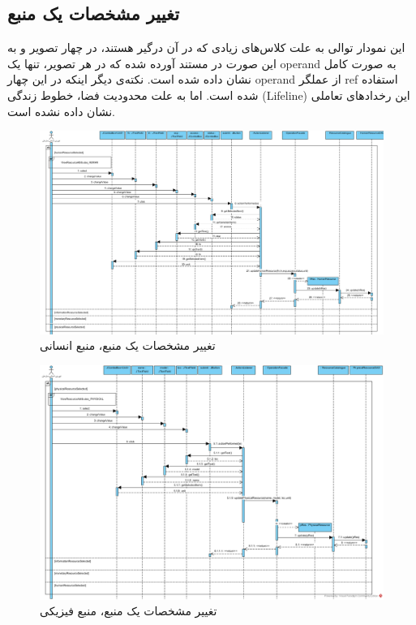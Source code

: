 \begin{landscape}
\section{تغییر مشخصات یک منبع}
این نمودار توالی به علت کلاس‌های زیادی که در آن درگیر هستند، در چهار تصویر و به این صورت در مستند آورده شده که در هر تصویر، تنها یک operand به صورت کامل نشان داده شده است. نکته‌ی دیگر اینکه در این چهار operand از عملگر ref استفاده شده است. اما به علت محدودیت فضا، خطوط زندگی (Lifeline) این رخدادهای تعاملی نشان داده نشده است.
\begin{figure}[H]
	\centering
	\includegraphics[scale=0.5]{img/sequence-design/EditResourceAttributes_HUMAN}
	\caption{تغییر مشخصات یک منبع، منبع انسانی}
\end{figure}
\begin{figure}[H]
	\centering
	\includegraphics[scale=0.6]{img/sequence-design/EditResourceAttributes_PHYSICAL}
	\caption{تغییر مشخصات یک منبع، منبع فیزیکی}
\end{figure}

\end{landscape}

